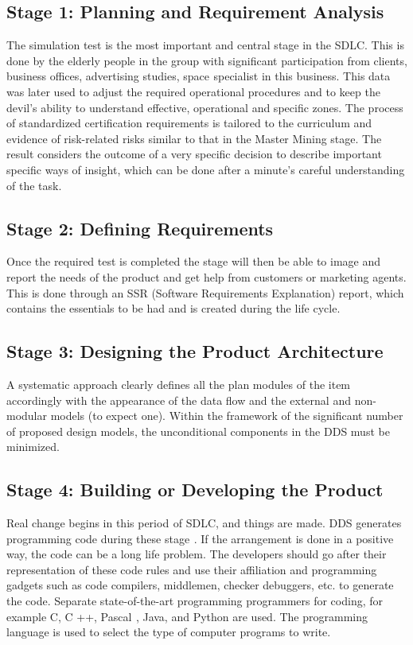 \documentclass[oneside,12pt]{Classes/VTU}
\begin{document}
    	 \subsection{Stage 1: Planning and Requirement Analysis}
    	The simulation test is the most important and central stage in the SDLC. This is done by the elderly people in the group with significant participation from clients, business offices, advertising studies, space\tiny\textcolor{white}{s}\normalsize specialist in this business. This data was later used to adjust the required operational procedures and to keep the devil's ability to understand effective, operational and specific zones. The process of standardized certification requirements is tailored to the curriculum and evidence of risk-related risks similar to that in the Master Mining stage. The result considers the outcome of a very specific decision to describe important specific ways of insight, which can be done after a minute's careful understanding of the task.
    	
    	\subsection{Stage 2: Defining Requirements}
    	Once the required test is completed the stage will then be able to image and report the needs of the product and get help from customers or marketing agents. This is done through an SSR (Software Requirements Explanation) report, which contains the essentials to be had and is created during the life cycle.
    	
    	\subsection{Stage 3: Designing the Product Architecture}
    	A systematic approach clearly defines all the plan modules of the item accordingly with the appearance of the data flow and the external and non-modular models (to expect one). Within the framework of the significant number of proposed design models, the unconditional components in the DDS must be minimized.
    	
    	\subsection{Stage 4: Building or Developing the Product}
    	Real change begins in this period\tiny\textcolor{white}{s}\normalsize of SDLC, and things are made. DDS generates programming code during these stage\tiny\textcolor{white}{s}\normalsize. If the arrangement is done in a positive way, the code can be a long life problem. The developers should go after their representation of these code rules and use their affiliation and programming gadgets such as code compilers, middlemen, checker debuggers, etc. to generate the code. Separate state-of-the-art programming programmers for coding, for example C, C ++, Pascal\tiny\textcolor{white}{s}\normalsize, Java, and Python are used. The programming language is used to select the type of computer programs to write.
    	
\end{document}
